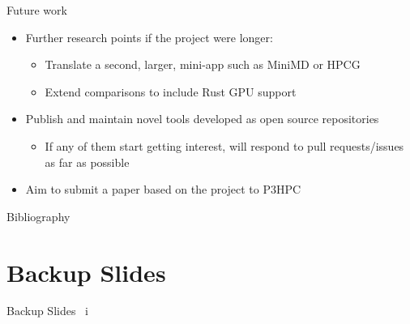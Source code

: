 \documentclass[10pt,aspectratio=169]{beamer}
\begin{document}
\begin{frame}{Future work}
\begin{itemize}
    \item<1-> Further research points if the project were longer:
    \begin{itemize}
        \item Translate a second, larger, mini-app such as MiniMD \cite{osti_1231191} or HPCG \cite{dongarra2015hpcg}
        \item Extend comparisons to include Rust GPU support
    \end{itemize}
    \vspace{1cm}
    \item<2-> \alert{Publish and maintain novel tools developed} as open source repositories
    \begin{itemize}
        \item If any of them start getting interest, will respond to pull requests/issues as far as possible
    \end{itemize}
    \item<3-> \alert{Aim to submit a paper} based on the project to P3HPC
\end{itemize}
\end{frame}




\appendix

%   
%   

\begin{frame}[allowframebreaks]{Bibliography}
    \printbibliography[heading=none]
\end{frame}

\section{Backup Slides}

\begin{frame}{Backup Slides \ i}
\end{frame}

\end{document}
